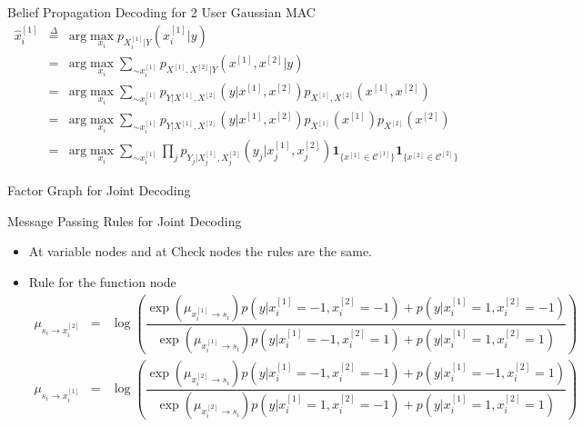 \documentclass{beamer}
\begin{document}
  \begin{frame}{Belief Propagation Decoding for 2 User Gaussian MAC}
    \begin{eqnarray}
  \hat{x}_i^{[1]} 	&\overset{\Delta}{=}& \text{arg} \max_{x_i}p_{X_i^{[1]}|Y}(x_i^{[1]}|y) \label{eq:mac1} \\
 			&=& \text{arg} \max_{x_i}\sum_{\sim x_i^{[1]}} p_{X^{[1]}, X^{[2]}|Y} (x^{[1]}, x^{[2]}|y)  \label{eq:mac2}\\
 			&=& \text{arg} \max_{x_i}\sum_{\sim x_i^{[1]}} p_{Y|X^{[1]}, X^{[2]}} (y|x^{[1]}, x^{[2]}) p_{X^{[1]}, X^{[2]}}(x^{[1]}, x^{[2]}) \label{eq:mac3}\\
 			&=& \text{arg} \max_{x_i}\sum_{\sim x_i^{[1]}} p_{Y|X^{[1]}, X^{[2]}} (y|x^{[1]}, x^{[2]}) p_{X^{[1]}}(x^{[1]}) p_{X^{[2]}}(x^{[2]}) \label{eq:mac4}\\
 			&=& \text{arg} \max_{x_i}\sum_{\sim x_i^{[1]}} \prod_j p_{Y_j|X_j^{[1]}, X_j^{[2]}} (y_j|x_j^{[1]}, x_j^{[2]}) \mathbf{1}_{\lbrace x^{[1]} \in \mathcal{C}^{[1]}\rbrace} \mathbf{1}_{\lbrace x^{[2]} \in \mathcal{C}^{[2]}\rbrace} \label{eq:mac5}
 \end{eqnarray}
  \end{frame}

  \begin{frame}{Factor Graph for Joint Decoding}
   
  \end{frame}

  \begin{frame}{Message Passing Rules for Joint Decoding}
   \begin{itemize}\itemsep 0.4cm
    \item At variable nodes and at Check nodes the rules are the same.
    \item Rule for the function node
    \fontsize{7pt}{7.2}\selectfont
    \begin{eqnarray}
  \mu_{s_i \rightarrow x_i^{[2]}} &=& \log \left( \dfrac{\exp( \mu_{x_i^{[1]} \rightarrow s_i}) p(y|x_i^{[1]} = -1, x_i^{[2]} = -1) + p(y|x_i^{[1]} = 1, x_i^{[2]} = -1)}{\exp( \mu_{x_i^{[1]} \rightarrow s_i}) p(y|x_i^{[1]} = -1, x_i^{[2]} = 1) + p(y|x_i^{[1]} = 1, x_i^{[2]} = 1)} \right) \\
  \mu_{s_i \rightarrow x_i^{[1]}} &=& \log \left( \dfrac{\exp( \mu_{x_i^{[2]} \rightarrow s_i}) p(y|x_i^{[1]} = -1, x_i^{[2]} = -1) + p(y|x_i^{[1]} = -1, x_i^{[2]} = 1)}{\exp( \mu_{x_i^{[2]} \rightarrow s_i}) p(y|x_i^{[1]} = 1, x_i^{[2]} = -1) + p(y|x_i^{[1]} = 1, x_i^{[2]} = 1)} \right)
  \end{eqnarray}
   \end{itemize}
  \end{frame}
\end{document}
